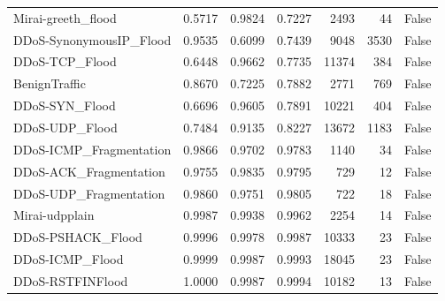 \begin{table}[t]
{\begin{tabular}{lrrrrrr}
Mirai-greeth\_flood & 0.5717 & 0.9824 & 0.7227 & 2493 & 44 & False \\
DDoS-SynonymousIP\_Flood & 0.9535 & 0.6099 & 0.7439 & 9048 & 3530 & False \\
DDoS-TCP\_Flood & 0.6448 & 0.9662 & 0.7735 & 11374 & 384 & False \\
BenignTraffic & 0.8670 & 0.7225 & 0.7882 & 2771 & 769 & False \\
DDoS-SYN\_Flood & 0.6696 & 0.9605 & 0.7891 & 10221 & 404 & False \\
DDoS-UDP\_Flood & 0.7484 & 0.9135 & 0.8227 & 13672 & 1183 & False \\
DDoS-ICMP\_Fragmentation & 0.9866 & 0.9702 & 0.9783 & 1140 & 34 & False \\
DDoS-ACK\_Fragmentation & 0.9755 & 0.9835 & 0.9795 & 729 & 12 & False \\
DDoS-UDP\_Fragmentation & 0.9860 & 0.9751 & 0.9805 & 722 & 18 & False \\
Mirai-udpplain & 0.9987 & 0.9938 & 0.9962 & 2254 & 14 & False \\
DDoS-PSHACK\_Flood & 0.9996 & 0.9978 & 0.9987 & 10333 & 23 & False \\
DDoS-ICMP\_Flood & 0.9999 & 0.9987 & 0.9993 & 18045 & 23 & False \\
DDoS-RSTFINFlood & 1.0000 & 0.9987 & 0.9994 & 10182 & 13 & False \\
\bottomrule
\end{tabular}
}
\end{table}
